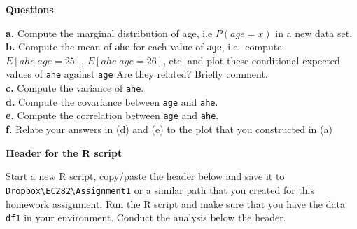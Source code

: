 \documentclass[
]{book}
\begin{document}
\textbf{Questions}

\textbf{a.} Compute the marginal distribution of age, i.e \(P(age=x)\) in a new data set.
\textbf{b.} Compute the mean of \texttt{ahe} for each value of \texttt{age}, i.e.~compute \(E[ahe|age=25]\),
\(E[ahe|age=26]\), etc. and plot these conditional expected values of \texttt{ahe} against \texttt{age} Are they related? Briefly comment.\\
\textbf{c.} Compute the variance of \texttt{ahe}.\\
\textbf{d.} Compute the covariance between \texttt{age} and \texttt{ahe}.\\
\textbf{e.} Compute the correlation between \texttt{age} and \texttt{ahe}.\\
\textbf{f.} Relate your answers in (d) and (e) to the plot that you constructed in (a)

\textbf{Header for the R script}

Start a new R script, copy/paste the header below and save it to \texttt{Dropbox\textbackslash{}EC282\textbackslash{}Assignment1} or a similar path that you created for this homework assignment. Run the R script and make sure that you have the data \texttt{df1} in your environment. Conduct the analysis below the header.
\end{document}
